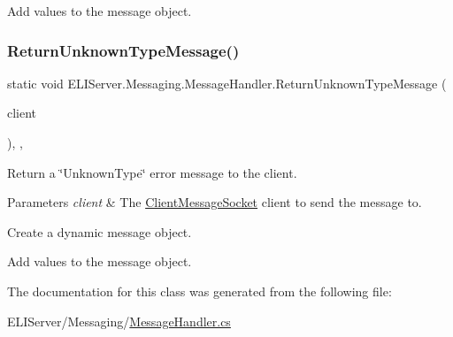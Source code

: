 Add values to the message object. \mbox{\label{class_e_l_i_server_1_1_messaging_1_1_message_handler_a760bf18782afa59dd63cf733ad7adb3a}} 
\subsubsection{\texorpdfstring{Return\+Unknown\+Type\+Message()}{ReturnUnknownTypeMessage()}}
{\footnotesize\ttfamily static void E\+L\+I\+Server.\+Messaging.\+Message\+Handler.\+Return\+Unknown\+Type\+Message (\begin{DoxyParamCaption}\item[{\hyperlink{class_e_l_i_server_1_1_messaging_1_1_client_message_socket}{Client\+Message\+Socket}}]{client }\end{DoxyParamCaption})\hspace{0.3cm}{\ttfamily [inline]}, {\ttfamily [static]}, {\ttfamily [private]}}



Return a \char`\"{}\+Unknown\+Type\char`\"{} error message to the client. 


\begin{DoxyParams}{Parameters}
{\em client} & The \hyperlink{class_e_l_i_server_1_1_messaging_1_1_client_message_socket}{Client\+Message\+Socket} client to send the message to.\\
\hline
\end{DoxyParams}
Create a dynamic message object.

Add values to the message object. 

The documentation for this class was generated from the following file\+:\begin{DoxyCompactItemize}
\item 
E\+L\+I\+Server/\+Messaging/\hyperlink{_message_handler_8cs}{Message\+Handler.\+cs}\end{DoxyCompactItemize}
